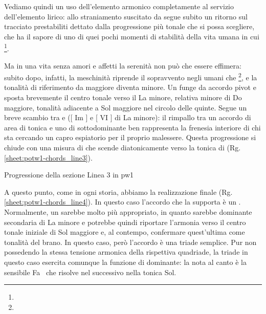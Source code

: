 \documentclass[class=book, crop=false, oneside, 12pt]{standalone}
\begin{document}
    Vediamo quindi un uso dell'elemento armonico completamente al servizio dell'elemento lirico: allo straniamento suscitato da  segue subito un ritorno sul tracciato prestabiliti dettato dalla progressione più tonale che si possa scegliere, che ha il sapore di uno di quei pochi momenti di stabilità della vita umana in cui  \footnote{}.

    Ma in una vita senza amori e affetti la serenità non può che essere effimera: subito dopo, infatti, la meschinità riprende il sopravvento negli umani che \footnote{}, e la tonalità di riferimento da maggiore diventa minore. Un  funge da accordo pivot e sposta brevemente il centro tonale verso il La minore, relativa minore di Do maggiore, tonalità adiacente a Sol maggiore nel circolo delle quinte. Segue un breve scambio tra  e  ([ Im ] e [ \flat VI ] di La minore): il rimpallo tra un accordo di area di tonica e uno di sottodominante ben rappresenta la frenesia interiore di chi sta cercando un capro espiatorio per il proprio malessere. Questa progressione si chiude con una misura di  che scende diatonicamente verso la tonica di  (Rg.\ref{sheet:potw1-chords_line3}).

    \begin{sheet}[htbp]
        \centering
        \caption{Progressione della sezione Linea 3 in \acrshort{pw1}}
        \label{sheet:potw1-chords_line3}
    \end{sheet}

    A questo punto, come in ogni storia, abbiamo la realizzazione finale (Rg.\ref{sheet:potw1-chords_line4}). In questo caso l'accordo che la supporta è un . Normalmente, un  sarebbe molto più appropriato, in quanto sarebbe dominante secondaria di La minore e potrebbe quindi riportare l'armonia verso il centro tonale iniziale di Sol maggiore e, al contempo, confermare quest'ultima come tonalità del brano. In questo caso, però l'accordo è una triade semplice. Pur non possedendo la stessa tensione armonica della rispettiva quadriade, la triade in questo caso esercita comunque la funzione di dominante: la nota al canto è la sensibile Fa\sharp~ che risolve nel successivo  nella tonica Sol. 
    
\end{document}
